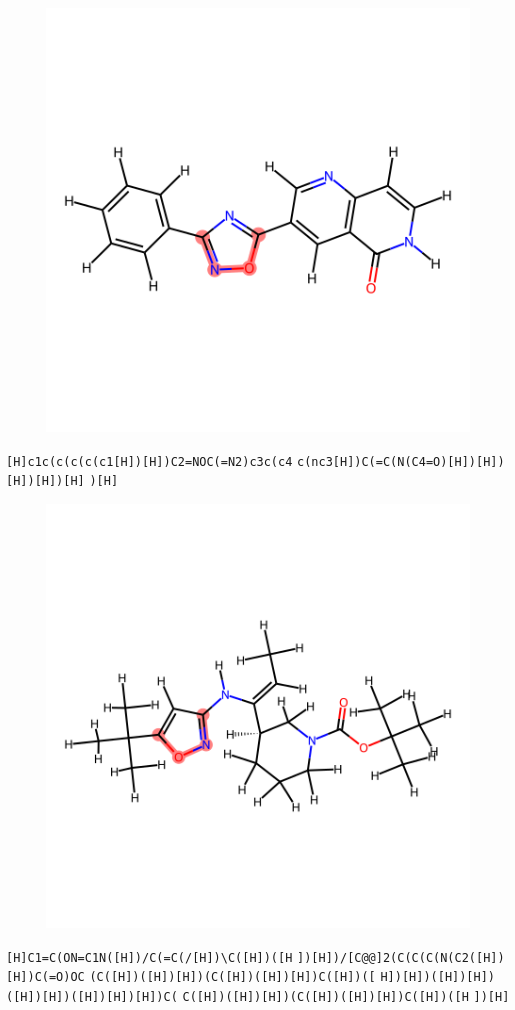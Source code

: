 \documentclass{article}
\begin{document}
\begin{figure}[ht]
\centering
    \includegraphics{mol118.png}
\end{figure}
\verb|[H]c1c(c(c(c(c1[H])[H])C2=NOC(=N2)c3c(c4| \verb|c(nc3[H])C(=C(N(C4=O)[H])[H])[H])[H])[H]| \verb|)[H]|

\begin{figure}[ht]
\centering
    \includegraphics{mol119.png}
\end{figure}
\verb|[H]C1=C(ON=C1N([H])/C(=C(/[H])\C([H])([H| \verb|])[H])/[C@@]2(C(C(C(N(C2([H])[H])C(=O)OC| \verb|(C([H])([H])[H])(C([H])([H])[H])C([H])([| \verb|H])[H])([H])[H])([H])[H])([H])[H])[H])C(| \verb|C([H])([H])[H])(C([H])([H])[H])C([H])([H| \verb|])[H]|
\end{document}
